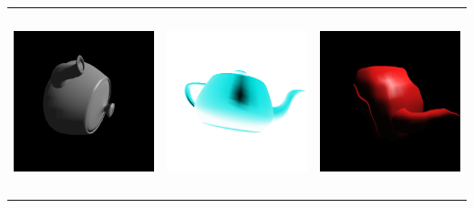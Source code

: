 \documentclass[12pt,a4paper,titlepage,final]{report}
\begin{document}
\begin{center}
\begin{tabular}{lcr}
	\includegraphics[height=53mm]{images/seda.png} &		
	\includegraphics[height=53mm]{images/invert.png} &
	\includegraphics[height=53mm]{images/sin.png} \\
	

\end{tabular}
\end{center}
\end{document}
